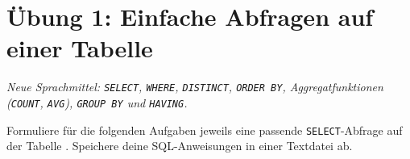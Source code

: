 \clearpage

\rehead[]{\textcolor{lightblue}{AvHG, Inf, My}}
\lohead[]{\textcolor{lightblue}{AvHG, Inf, My}}

\section{Übung 1: Einfache Abfragen auf einer Tabelle \tagPflicht}
\noindent \emph{Neue Sprachmittel: \texttt{SELECT}, \texttt{WHERE}, \texttt{DISTINCT}, \texttt{ORDER BY}, Aggregatfunktionen (\texttt{COUNT}, \texttt{AVG}), \texttt{GROUP BY} und \texttt{HAVING}.}

Formuliere für die folgenden Aufgaben jeweils eine passende
\lstinline|SELECT|-Abfrage auf der Tabelle . Speichere deine
SQL-Anweisungen in einer Textdatei ab.

